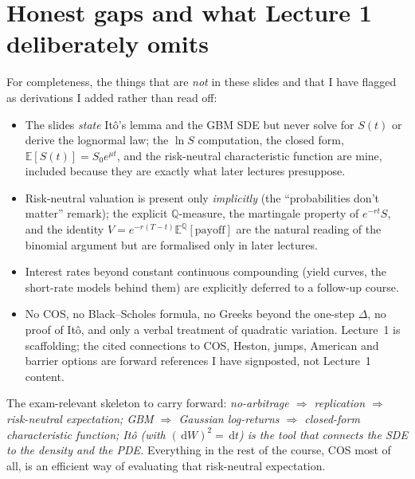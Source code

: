 \documentclass[11pt]{article}
\newcommand{\E}{\mathbb{E}}
\newcommand{\dd}{\,\mathrm{d}}
\begin{document}
\section{Honest gaps and what Lecture 1 deliberately omits}

For completeness, the things that are \emph{not} in these slides and that I have flagged as derivations I added rather than read off:
\begin{itemize}[nosep]
\item The slides \emph{state} It\^o's lemma and the GBM SDE but never solve for $S(t)$ or derive the lognormal law; the $\ln S$ computation, the closed form, $\E[S(t)]=S_0e^{\mu t}$, and the risk-neutral characteristic function are mine, included because they are exactly what later lectures presuppose.
\item Risk-neutral valuation is present only \emph{implicitly} (the ``probabilities don't matter'' remark); the explicit $\mathbb{Q}$-measure, the martingale property of $e^{-rt}S$, and the identity $V=e^{-r(T-t)}\E^{\mathbb{Q}}[\text{payoff}]$ are the natural reading of the binomial argument but are formalised only in later lectures.
\item Interest rates beyond constant continuous compounding (yield curves, the short-rate models behind them) are explicitly deferred to a follow-up course.
\item No COS, no Black--Scholes formula, no Greeks beyond the one-step $\Delta$, no proof of It\^o, and only a verbal treatment of quadratic variation. Lecture~1 is scaffolding; the cited connections to COS, Heston, jumps, American and barrier options are forward references I have signposted, not Lecture~1 content.
\end{itemize}
The exam-relevant skeleton to carry forward: \emph{no-arbitrage $\Rightarrow$ replication $\Rightarrow$ risk-neutral expectation; GBM $\Rightarrow$ Gaussian log-returns $\Rightarrow$ closed-form characteristic function; It\^o (with $(\dd W)^2=\dd t$) is the tool that connects the SDE to the density and the PDE.} Everything in the rest of the course, COS most of all, is an efficient way of evaluating that risk-neutral expectation.
\end{document}

